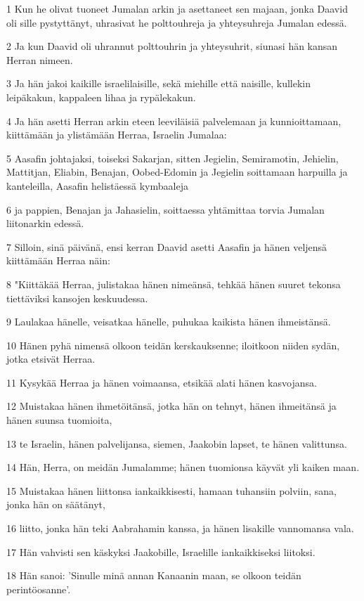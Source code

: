 \par 1 Kun he olivat tuoneet Jumalan arkin ja asettaneet sen majaan, jonka Daavid oli sille pystyttänyt, uhrasivat he polttouhreja ja yhteysuhreja Jumalan edessä.
\par 2 Ja kun Daavid oli uhrannut polttouhrin ja yhteysuhrit, siunasi hän kansan Herran nimeen.
\par 3 Ja hän jakoi kaikille israelilaisille, sekä miehille että naisille, kullekin leipäkakun, kappaleen lihaa ja rypälekakun.
\par 4 Ja hän asetti Herran arkin eteen leeviläisiä palvelemaan ja kunnioittamaan, kiittämään ja ylistämään Herraa, Israelin Jumalaa:
\par 5 Aasafin johtajaksi, toiseksi Sakarjan, sitten Jegielin, Semiramotin, Jehielin, Mattitjan, Eliabin, Benajan, Oobed-Edomin ja Jegielin soittamaan harpuilla ja kanteleilla, Aasafin helistäessä kymbaaleja
\par 6 ja pappien, Benajan ja Jahasielin, soittaessa yhtämittaa torvia Jumalan liitonarkin edessä.
\par 7 Silloin, sinä päivänä, ensi kerran Daavid asetti Aasafin ja hänen veljensä kiittämään Herraa näin:
\par 8 "Kiittäkää Herraa, julistakaa hänen nimeänsä, tehkää hänen suuret tekonsa tiettäviksi kansojen keskuudessa.
\par 9 Laulakaa hänelle, veisatkaa hänelle, puhukaa kaikista hänen ihmeistänsä.
\par 10 Hänen pyhä nimensä olkoon teidän kerskauksenne; iloitkoon niiden sydän, jotka etsivät Herraa.
\par 11 Kysykää Herraa ja hänen voimaansa, etsikää alati hänen kasvojansa.
\par 12 Muistakaa hänen ihmetöitänsä, jotka hän on tehnyt, hänen ihmeitänsä ja hänen suunsa tuomioita,
\par 13 te Israelin, hänen palvelijansa, siemen, Jaakobin lapset, te hänen valittunsa.
\par 14 Hän, Herra, on meidän Jumalamme; hänen tuomionsa käyvät yli kaiken maan.
\par 15 Muistakaa hänen liittonsa iankaikkisesti, hamaan tuhansiin polviin, sana, jonka hän on säätänyt,
\par 16 liitto, jonka hän teki Aabrahamin kanssa, ja hänen lisakille vannomansa vala.
\par 17 Hän vahvisti sen käskyksi Jaakobille, Israelille iankaikkiseksi liitoksi.
\par 18 Hän sanoi: 'Sinulle minä annan Kanaanin maan, se olkoon teidän perintöosanne'.
